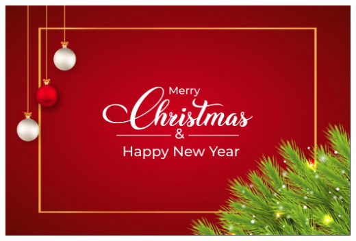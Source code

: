 \documentclass[12pt,a4paper]{article}
\begin{document}
\vspace{1.5cm}
\hspace{-2.5cm}
\includegraphics[scale=.6]{happy.png}
\end{document}
